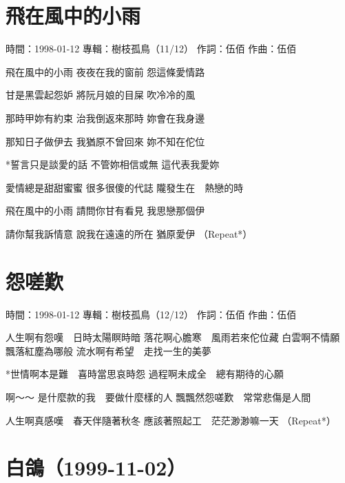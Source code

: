 \documentclass[UTF8,a4paper,oneside,twocolumn,12pt]{ctexbook}
\newcommand{\infopair}[2]{\textbullet #1：#2}
\newcommand{\zc}[1][伍佰]{\infopair{作詞}{#1}}
\newcommand{\zq}[1][伍佰]{\infopair{作曲}{#1}}
\newcommand{\zj}[1]{\infopair{專輯}{#1}}
\newcommand{\sj}[1]{\infopair{時間}{#1}}
\newenvironment{info}{\begin{flushleft}\kaishu
	}
	{\end{flushleft}\normalsize\yahei\par}
\newenvironment{lyric}{
	}
{}
\begin{document}
\section{飛在風中的小雨}
\begin{info}
	\sj{1998-01-12}
	\zj{樹枝孤鳥（11/12）}
	\zc
	\zq
\end{info}
\begin{lyric}
	飛在風中的小雨
	夜夜在我的窗前
	怨這條愛情路

	甘是黑雲起怨妒
	將阮月娘的目屎
	吹冷冷的風

	那時甲妳有約束
	治我倒返來那時
	妳會在我身邊

	那知日子做伊去
	我猶原不曾回來
	妳不知在佗位

	*誓言只是談愛的話
	不管妳相信或無
	這代表我愛妳

	愛情總是甜甜蜜蜜
	很多很傻的代誌
	隴發生在　熱戀的時

	飛在風中的小雨
	請問你甘有看見
	我思戀那個伊

	請你幫我訴情意
	說我在遠遠的所在
	猶原愛伊
	（Repeat*）
\end{lyric}

\section{怨嗟歎}
\begin{info}
	\sj{1998-01-12}
	\zj{樹枝孤鳥（12/12）}
	\zc
	\zq
\end{info}
\begin{lyric}
	人生啊有怨嘆　日時太陽瞑時暗
	落花啊心膽寒　風雨若來佗位藏
	白雲啊不情願　飄落紅塵為哪般
	流水啊有希望　走找一生的美夢

	*世情啊本是難　喜時當思哀時怨
	過程啊未成全　總有期待的心願

	啊～～
	是什麼款的我　要做什麼樣的人
	飄飄然怨嗟歎　常常悲傷是人間

	人生啊真感嘆　春天伴隨著秋冬
	應該著照起工　茫茫渺渺嘛一天
	（Repeat*）
\end{lyric}


\section*{白鴿（1999-11-02）}
\end{document}
